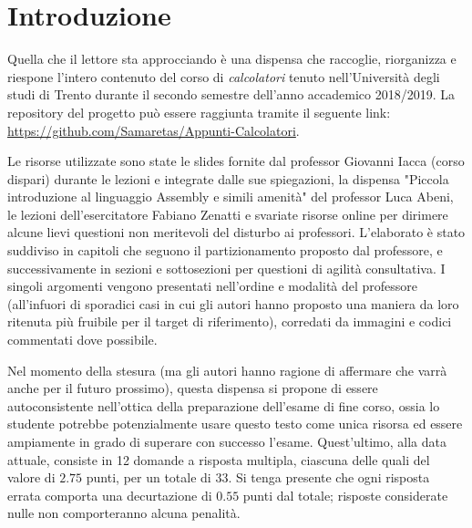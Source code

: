 \documentclass[class=book, crop=false, oneside]{standalone}
\begin{document}
\chapter*{Introduzione}

Quella che il lettore sta approcciando è una dispensa che raccoglie, riorganizza e riespone l'intero contenuto del corso di \emph{calcolatori} tenuto nell'Università degli studi di Trento durante il secondo semestre dell'anno accademico 2018/2019. La repository del progetto può essere raggiunta tramite il seguente link: \url{https://github.com/Samaretas/Appunti-Calcolatori}.

Le risorse utilizzate sono state le slides fornite dal professor Giovanni Iacca (corso dispari) durante le lezioni e integrate dalle sue spiegazioni, la dispensa "Piccola introduzione al linguaggio Assembly e simili amenità" del professor Luca Abeni, le lezioni dell'esercitatore Fabiano Zenatti e svariate risorse online per dirimere alcune lievi questioni non meritevoli del disturbo ai professori. L'elaborato è stato suddiviso in capitoli che seguono il partizionamento proposto dal professore, e successivamente in sezioni e sottosezioni per questioni di agilità consultativa. I singoli argomenti vengono presentati nell'ordine e modalità del professore (all'infuori di sporadici casi in cui gli autori hanno proposto una maniera da loro ritenuta più fruibile per il target di riferimento), corredati da immagini e codici commentati dove possibile.

Nel momento della stesura (ma gli autori hanno ragione di affermare che varrà anche per il futuro prossimo), questa dispensa si propone di essere autoconsistente nell'ottica della preparazione dell'esame di fine corso, ossia lo studente potrebbe potenzialmente usare questo testo come unica risorsa ed essere ampiamente in grado di superare con successo l'esame. Quest'ultimo, alla data attuale, consiste in 12 domande a risposta multipla, ciascuna delle quali del valore di \(2.75\) punti, per un totale di \(33\). Si tenga presente che ogni risposta errata comporta una decurtazione di \(0.55\) punti dal totale; risposte considerate nulle non comporteranno alcuna penalità.
\end{document}
